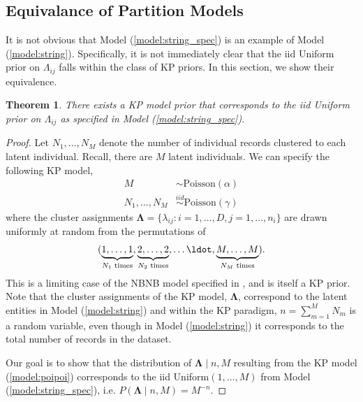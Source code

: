 \documentclass[11pt]{article}
\newtheorem{theorem}{Theorem}
\begin{document}
\subsection{Equivalance of Partition Models}
It is not obvious that Model (\ref{model:string_spec}) is an example of Model (\ref{model:string}). Specifically, it is not immediately clear that the iid Uniform prior on $\Lambda_{ij}$ falls within the class of KP priors. In this section, we show their equivalence.

\begin{theorem}
\label{thm:equiv}
There exists a KP model prior that corresponds to the iid Uniform prior on $\Lambda_{ij}$ as specified in Model (\ref{model:string_spec}).
\end{theorem}

\begin{proof}
Let $N_1, \dots, N_M$ denote the number of individual records clustered to each latent individual. Recall, there are $M$ latent individuals. We can specify the following KP model,
\begin{align}
M &\sim \text{Poisson}(\alpha)\\
N_1, \dots, N_M &\stackrel{iid}{\sim} \text{Poisson}(\gamma) \label{model:poipoi}
\end{align}
where the cluster assignments $\boldsymbol \Lambda = \{\lambda_{ij}: i = 1, \dots, D, j = 1, \dots, n_i\}$ are drawn uniformly at random from the permutations of
\begin{align}
(\underbrace{1,\ldots,1}_\text{$N_1$ times},\underbrace{2,\ldots,2}_\text{$N_2$ times},\ldots\ldot , \underbrace{M,\ldots,M}_\text{$N_M$ times}).
\label{eqn:vector}
\end{align}
This is a limiting case of the NBNB model specified in \cite{zanella2016microclustering}, and is itself a KP prior. Note that the cluster assignments of the KP model, $\boldsymbol \Lambda$, correspond to the latent entities in Model (\ref{model:string}) and within the KP paradigm, $n = \sum_{m=1}^M N_m$ is a random variable, even though in Model (\ref{model:string}) it corresponds to the total number of records in the dataset.

Our goal is to show that the distribution of $\boldsymbol \Lambda \mid n, M$ resulting from the KP model (\ref{model:poipoi}) corresponds to the iid Uniform$(1, \dots, M)$ from Model (\ref{model:string_spec}), i.e. $P(\boldsymbol \Lambda \mid n, M) = M^{-n}$.


\end{proof}
\end{document}
